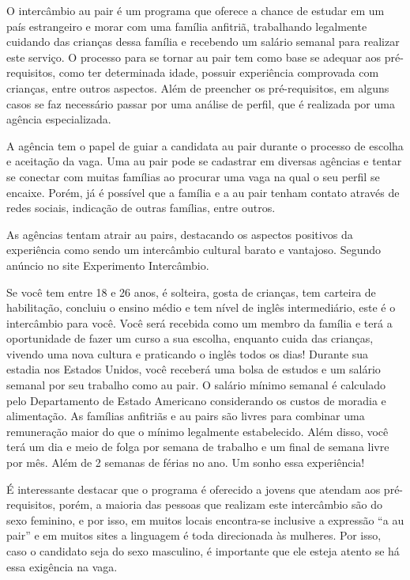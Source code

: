     O intercâmbio au pair é um programa que oferece a chance de estudar em um país estrangeiro e morar com uma família anfitriã, trabalhando legalmente cuidando das crianças dessa família e recebendo um salário semanal para realizar este serviço. O processo para se tornar au pair tem como base se adequar aos pré-requisitos, como ter determinada idade, possuir experiência comprovada com crianças, entre outros aspectos. Além de preencher os pré-requisitos, em alguns casos se faz necessário passar por uma análise de perfil, que é realizada por uma agência especializada.

    A agência tem o papel de guiar a candidata au pair durante o processo de escolha e aceitação da vaga. Uma au pair pode se cadastrar em diversas agências e tentar se conectar com muitas famílias ao procurar uma vaga na qual o seu perfil se encaixe. Porém, já é possível que a família e a au pair tenham contato através de redes sociais, indicação de outras famílias, entre outros.

    As agências tentam atrair au pairs, destacando os aspectos positivos da experiência como sendo um intercâmbio cultural barato e vantajoso. Segundo anúncio no site Experimento Intercâmbio.
    
    \begin{citacao}
        Se você tem entre 18 e 26 anos, é solteira, gosta de crianças, tem carteira de habilitação, concluiu o ensino médio e tem nível de inglês intermediário, este é o intercâmbio para você. Você será recebida como um membro da família e terá a oportunidade de fazer um curso a sua escolha, enquanto cuida das crianças, vivendo uma nova cultura e praticando o inglês todos os dias! Durante sua estadia nos Estados Unidos, você receberá uma bolsa de estudos e um salário semanal por seu trabalho como au pair. O salário mínimo semanal é calculado pelo Departamento de Estado Americano considerando os custos de moradia e alimentação. As famílias anfitriãs e au pairs são livres para combinar uma remuneração maior do que o mínimo legalmente estabelecido. Além disso, você terá um dia e meio de folga por semana de trabalho e um final de semana livre por mês. Além de 2 semanas de férias no ano. Um sonho essa experiência!
        \cite{experimCultl2022}
    \end{citacao}

    É interessante destacar que o programa é oferecido a jovens que atendam aos pré-requisitos, porém, a maioria das pessoas que realizam este intercâmbio são do sexo feminino, e por isso, em muitos locais encontra-se inclusive a expressão “a au pair” e em muitos sites a linguagem é toda direcionada às mulheres. Por isso, caso o candidato seja do sexo masculino, é importante que ele esteja atento se há essa exigência na vaga.
    
